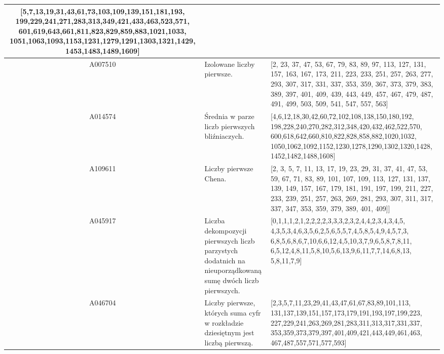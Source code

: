 \documentclass[10pt,onecolumn]{article}
\theoremstyle{definition}
\theoremstyle{hypothesis}
\theoremstyle{capability}
\begin{document}
\begin{landscape}
\begin{tabularx}{\linewidth}{ |c|X|X| }
[5,7,13,19,31,43,61,73,103,109,139,151,181,193,
 199,229,241,271,283,313,349,421,433,463,523,571,
 601,619,643,661,811,823,829,859,883,1021,1033,
 1051,1063,1093,1153,1231,1279,1291,1303,1321,1429,
 1453,1483,1489,1609] \\
  \hline
A007510  & Izolowane liczby pierwsze. & 
[2, 23, 37, 47, 53, 67, 79, 83, 89, 97, 113, 127, 131, 157, 163, 167, 173, 211, 223, 233, 251, 257, 263, 277, 293, 307, 317, 331, 337, 353, 359, 367, 373, 379, 383, 389, 397, 401, 409, 439, 443, 449, 457, 467, 479, 487, 491, 499, 503, 509, 541, 547, 557, 563] \\
  \hline
A014574  & Średnia w parze liczb pierwszych bliźniaczych. & 
[4,6,12,18,30,42,60,72,102,108,138,150,180,192,
 198,228,240,270,282,312,348,420,432,462,522,570,
 600,618,642,660,810,822,828,858,882,1020,1032,
 1050,1062,1092,1152,1230,1278,1290,1302,1320,1428,
 1452,1482,1488,1608] \\
  \hline
A109611 & Liczby pierwsze Chena. & 
[2, 3, 5, 7, 11, 13, 17, 19, 23, 29, 31, 37, 41, 47, 53, 59, 67, 71, 83, 89, 101, 107, 109, 113, 127, 131, 137, 139, 149, 157, 167, 179, 181, 191, 197, 199, 211, 227, 233, 239, 251, 257, 263, 269, 281, 293, 307, 311, 317, 337, 347, 353, 359, 379, 389, 401, 409]] \\
  \hline
A045917 & Liczba dekompozycji pierwszych liczb parzystych dodatnich na nieuporządkowaną sumę dwóch liczb pierwszych. & 
[0,1,1,1,2,1,2,2,2,2,3,3,3,2,3,2,4,4,2,3,4,3,4,5,
 4,3,5,3,4,6,3,5,6,2,5,6,5,5,7,4,5,8,5,4,9,4,5,7,3,
 6,8,5,6,8,6,7,10,6,6,12,4,5,10,3,7,9,6,5,8,7,8,11,
 6,5,12,4,8,11,5,8,10,5,6,13,9,6,11,7,7,14,6,8,13,
 5,8,11,7,9] \\
  \hline
A046704 & Liczby pierwsze, których suma cyfr w rozkładzie dziesiętnym jest liczbą pierwszą. & 
[2,3,5,7,11,23,29,41,43,47,61,67,83,89,101,113,
 131,137,139,151,157,173,179,191,193,197,199,223,
 227,229,241,263,269,281,283,311,313,317,331,337,
 353,359,373,379,397,401,409,421,443,449,461,463,
 467,487,557,571,577,593] \\
  \hline
\end{tabularx}

\end{landscape}

\newpage

\end{document}
